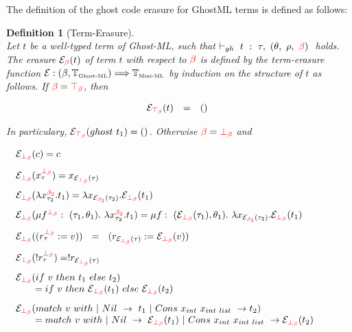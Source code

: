 \documentclass[a4paper,11pt,oneside]{article}
\theoremstyle{plain}
\newtheorem{definition}{Definition}[subsection]
\newcommand{\rouge}[1]{\textcolor{red}{#1}}
\newcommand{\ghosttyping}[6]{\vdash_{gh}~#1~:~#2,~(#3,~#4,~\rouge{#5})~\textcolor{blue}{\boldsymbol{#6}}}
\newcommand{\gb}{\beta}
\newcommand{\gba}[1]{\beta_{#1}}
\newcommand{\gbb}{\bot_\beta}
\newcommand{\gbt}{\top_\beta}
\newcommand{\gbr}{\textcolor{red}{\gb}}
\newcommand{\gbra}[1]{\textcolor{red}{\gba{#1}}}
\newcommand{\gbbr}{\textcolor{red}{\gbb}}
\newcommand{\gbtr}{\textcolor{red}{\gbt}}
\newcommand{\e}{\mathcal{E}}
\newcommand{\ebot}[1]{\e_{\gbbr}(#1)}
\newcommand{\etop}[1]{\e_{\gbtr}(#1)}
\newcommand{\egbra}[2]{\e_{\gbra{#1}}(#2)}
\begin{document}
The definition of the ghost code erasure for GhostML terms is defined as follows:
\begin{definition}[Term-Erasure] 
\label{term-erasure}
\hypertarget{term-erasure}{}
~\\
Let $t$ be a well-typed term of Ghost-ML, such that 
$\ghosttyping
	{t}
	{\tau}
	{\theta}
	{\rho}
	{\gbr}
	{}$ holds.
The erasure $\e_{\gbr}(t)$ of term $t$ with respect to $\gbr$ is
defined by the term-erasure function $\e: (\beta, \mathbb{T}_{\text{\tiny Ghost-ML}}) \Longrightarrow \mathbb{T}_{\text{\tiny Mini-ML}}$ by induction on the structure of $t$ as follows.
If $\gbr = \gbtr$, then
\begin{small}
\begin{adjustwidth}{0cm}{0cm}
\begin{displaymath} 
\begin{array}{lllr}
~~ \etop{t} &=& () & 
\end{array}
\end{displaymath}
\end{adjustwidth}
\end{small}
In particulary, $\etop{ghost~t_1} = ()$. Otherwise $\gbr = \gbbr$ and  
\begin{small}
\begin{adjustwidth}{0cm}{0cm}
\begin{displaymath} 
\begin{array}{llll}
\ebot{c} =c &  & &\\[0.3cm]

\ebot{x^{\gbbr}_{\tau}} = x_{\ebot{\tau}} &  & &\\[0.3cm]

\ebot{\lambda x^{\gbra{2}}_{\tau_2} . t_1} =  
\lambda x_{\egbra{2}{{\tau_2}}} . \ebot{t_1}  & & &\\[0.3cm]

\ebot{
	\mu f^{\gbbr}:~(\tau_1, \theta_1).~\lambda x^{\gbra{2}}_{\tau_2}. t_1} =
	\mu f:~(\ebot{\tau_1}, \theta_1).~\lambda x_{\egbra{2}{\tau_2}}. \ebot{t_1} & & &
	\\[0.3cm]

\ebot{(r^{\gbbr}_{\tau}:= v)} ~~ = ~~ (r_{\ebot{\tau}} := \ebot{v}) & & &  \\[0.3cm]
\ebot{!r^{\gbbr}_{\tau}} = !r_{\ebot{\tau}} & & &  \\[0.3cm]	
	
\ebot{if~v~then~t_1~else~t_2} & & & \\
\qquad = if~v~then~\ebot{t_1}~else~\ebot{t_2} & & & \\[0.3cm]
\ebot{match~v~with ~|~Nil~->~t_1~|~Cons~x_{int}~x_{int~list}~->t_2} & & & \\
\qquad = match~v~with ~|~Nil~->~\ebot{t_1}~|~Cons~x_{int}~x_{int~list}~->\ebot{t_2} & & &  
\end{array}
\end{displaymath}
\end{adjustwidth}
\end{small}


\end{definition}
\end{document}

